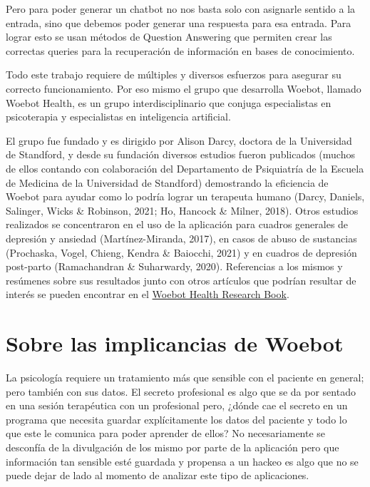 \documentclass[11pt]{article}
\begin{document}
Pero para poder generar un chatbot no nos basta solo con asignarle sentido a la entrada, 
sino que debemos poder generar una respuesta para esa entrada. Para lograr esto se usan métodos de 
Question Answering que permiten crear las correctas queries para la recuperación de información en bases de conocimiento.


Todo este trabajo requiere de múltiples y diversos esfuerzos para asegurar 
su correcto funcionamiento. Por eso mismo
el grupo que desarrolla Woebot, llamado Woebot Health, es un grupo interdisciplinario que conjuga especialistas en 
psicoterapia y especialistas en inteligencia artificial. 

El grupo fue fundado y es dirigido por Alison Darcy, doctora de la Universidad de Standford, y desde
su fundación diversos estudios fueron publicados 
(muchos de ellos contando con colaboración del Departamento de Psiquiatría 
de la Escuela de Medicina de la Universidad de Standford) demostrando la 
eficiencia de Woebot para ayudar como lo podría lograr un terapeuta humano (Darcy, Daniels, Salinger, Wicks \& Robinson, 2021; Ho, Hancock \& Milner, 2018). 
Otros estudios realizados se concentraron en el uso de la aplicación para cuadros generales de depresión y ansiedad (Martínez-Miranda, 2017), 
en casos de abuso de sustancias (Prochaska, Vogel, Chieng, Kendra \& Baiocchi, 2021) y en cuadros de depresión post-parto (Ramachandran \& Suharwardy, 2020).
Referencias a los mismos y resúmenes sobre sus resultados 
junto con otros artículos que podrían resultar de interés
se pueden encontrar en el \href{https://woebothealth.com/img/2021/05/Woebot-Health-Research-Bibliography_May-2021-1-1.pdf}{Woebot Health Research Book}.

\section{Sobre las implicancias de Woebot}

La psicología requiere un tratamiento más que sensible
con el paciente en general; pero también con sus datos.
El secreto profesional es algo que se da por sentado en
una sesión terapéutica con un profesional pero, ¿dónde cae
el secreto en un programa que necesita guardar explícitamente
los datos del paciente y todo lo que este le comunica
para poder aprender de ellos? No necesariamente se desconfía
de la divulgación de los mismo por parte de la aplicación
pero que información tan sensible esté guardada y propensa a
un hackeo es algo que no se puede dejar de lado al momento
de analizar este tipo de aplicaciones.
\end{document}
